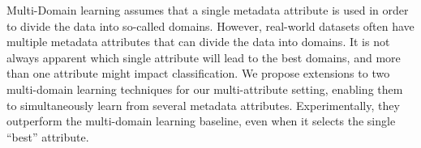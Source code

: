 Multi-Domain learning assumes that a single metadata attribute is used in order to divide the data into so-called domains. However, real-world datasets often
 have multiple metadata attributes that can divide the data into domains. It is
 not always apparent which single attribute will lead to the best domains, and
 more than one attribute might impact classification. We propose extensions to
 two multi-domain learning techniques for our multi-attribute setting, enabling
 them to simultaneously learn from several metadata attributes. Experimentally,
 they outperform the multi-domain learning baseline, even when it selects the
 single ``best'' attribute.

